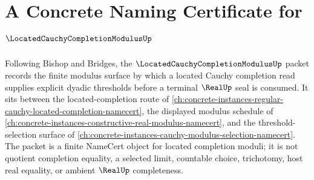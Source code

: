 \chapter{A Concrete Naming Certificate for $\LocatedCauchyCompletionModulusUp$}
\label{ch:concrete-instances-located-cauchy-completion-modulus-namecert}

Following Bishop and Bridges, the $\LocatedCauchyCompletionModulusUp$ packet records the finite modulus surface by which a located Cauchy completion read supplies explicit dyadic thresholds before a terminal $\RealUp$ seal is consumed. It sits between the located-completion route of \autoref{ch:concrete-instances-regular-cauchy-located-completion-namecert}, the displayed modulus schedule of \autoref{ch:concrete-instances-constructive-real-modulus-namecert}, and the threshold-selection surface of \autoref{ch:concrete-instances-cauchy-modulus-selection-namecert}. The packet is a finite NameCert object for located completion moduli; it is not quotient completion equality, a selected limit, countable choice, trichotomy, host real equality, or ambient $\RealUp$ completeness.

